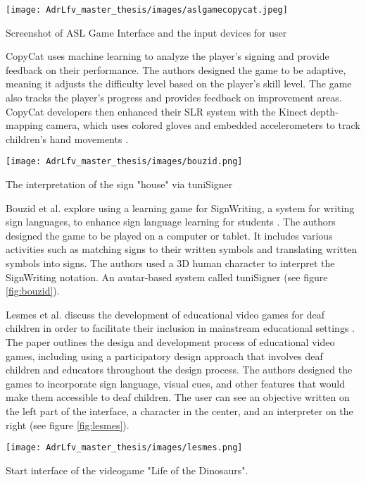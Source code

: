 \begin{marginfigure}
    \centering
    \texttt{[image: AdrLfv\_master\_thesis/images/aslgamecopycat.jpeg]}
    \caption{Screenshot of ASL Game Interface and the input devices for user  }
    \label{fig:aslgamecopycat}
\end{marginfigure}

CopyCat uses machine learning to analyze the player's signing and provide feedback on their performance. The authors designed the game to be adaptive, meaning it adjusts the difficulty level based on the player's skill level. The game also tracks the player's progress and provides feedback on improvement areas.
CopyCat developers then enhanced their SLR system with the Kinect depth-mapping camera, which uses colored gloves and embedded accelerometers to track children's hand movements \cite{zafrulla2011american}.

\begin{marginfigure}
    \centering
    \texttt{[image: AdrLfv\_master\_thesis/images/bouzid.png]}
    \caption{The interpretation of the sign "house" via tuniSigner}
    \label{fig:bouzid}
\end{marginfigure}

Bouzid et al. explore using a learning game for SignWriting, a system for writing sign languages, to enhance sign language learning for students \cite{bouzid2016using}. The authors designed the game to be played on a computer or tablet. It includes various activities such as matching signs to their written symbols and translating written symbols into signs. The authors used a 3D human character to interpret the SignWriting notation. An avatar-based system called tuniSigner \cite{bouzid2013avatar} (see figure \ref{fig:bouzid}).

Lesmes et al. discuss the development of educational video games for deaf children in order to facilitate their inclusion in mainstream educational settings \cite{lesmes2022design}. 
The paper outlines the design and development process of educational video games, including using a participatory design approach that involves deaf children and educators throughout the design process. 
The authors designed the games to incorporate sign language, visual cues, and other features that would make them accessible to deaf children. The user can see an objective written on the left part of the interface, a character in the center, and an interpreter on the right (see figure \ref{fig:lesmes}).

\begin{marginfigure}
    \centering
    \texttt{[image: AdrLfv\_master\_thesis/images/lesmes.png]}
    \caption{Start interface of the videogame "Life of the Dinosaurs".}
    \label{fig:lesmes}
\end{marginfigure}

